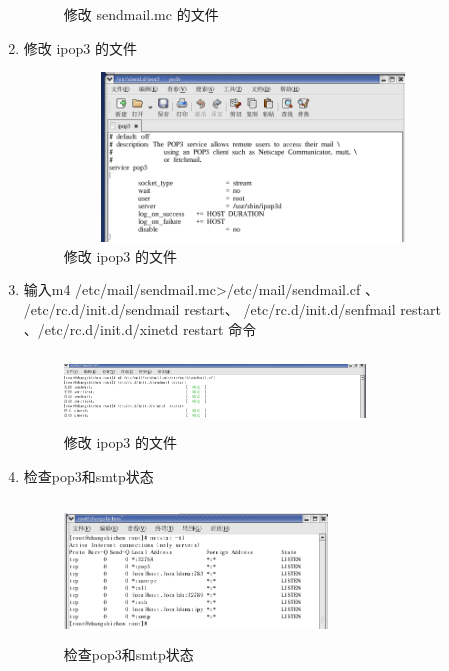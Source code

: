 \documentclass{article}
\begin{document}
\begin{enumerate}
\begin{figure}[h]
    \caption{修改 sendmail.mc 的文件}
\end{figure}
\newpage
\item 修改 ipop3 的文件\\
\begin{figure}[h]
    \centering
    \includegraphics[width=10cm,height=4.5cm]{8.png}
    \caption{修改 ipop3 的文件}
\end{figure}
\item 输入m4 /etc/mail/sendmail.mc>/etc/mail/sendmail.cf 、 /etc/rc.d/init.d/sendmail restart、
        /etc/rc.d/init.d/senfmail restart 、/etc/rc.d/init.d/xinetd restart 命令\\
\begin{figure}[h]
    \centering
    \includegraphics[width=8cm,height=2cm]{9.png}
    \caption{修改 ipop3 的文件}
\end{figure}
\item 检查pop3和smtp状态\\
\begin{figure}[h]
    \centering
    \includegraphics[width=7cm,height=3.7cm]{10.png}
    \caption{检查pop3和smtp状态}
\end{figure}


\end{enumerate}
\end{document}
